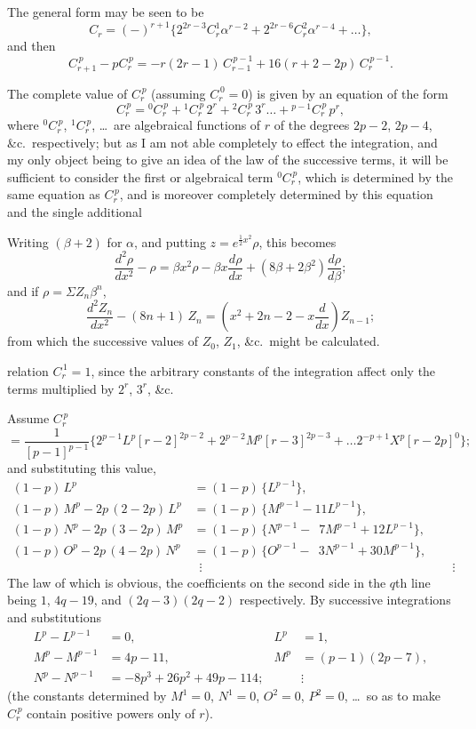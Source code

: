 \documentclass[12pt,a4paper]{article}
\theoremstyle{plain}
\begin{document}
The general form may be seen to be
\[
C_r = (-)^{r+1} \{2^{2r-3} C_r^1 \alpha^{r-2} + 2^{2r-6} C_r^2 \alpha^{r-4} + \ldots\},
\]
and then
\[
C_{r+1}^{\,p} - p C_r^{\,p} = -r(2r-1)\, C_{r-1}^{\,p-1} + 16(r+2-2p)\, C_r^{\,p-1}.
\]

The complete value of $C_r^{\,p}$ (assuming $C_r^{\,0} = 0$) is given by an equation of the form
\[
C_r^{\,p} = {}^0 C_r^{\,p} + {}^1 C_r^{\,p}\, 2^r + {}^2 C_r^{\,p}\, 3^r \ldots + {}^{p-1} C_r^{\,p}\, p^r,
\]
where ${}^0 C_r^{\,p}$, ${}^1 C_r^{\,p}$, \ldots\ are algebraical functions of $r$ of the degrees $2p-2$, $2p-4$, \&c.\ respectively; but as I am not able completely to effect the integration, and my only object being to give an idea of the law of the successive terms, it will be sufficient to consider the first or algebraical term ${}^0 C_r^{\,p}$, which is determined by the same equation as $C_r^{\,p}$, and is moreover completely determined by this equation and the single additional

Writing $(\beta + 2)$ for $\alpha$, and putting $z = e^{\frac{1}{2}x^2} \rho$, this becomes
\[
\frac{d^2 \rho}{dx^2} - \rho = \beta x^2 \rho - \beta x \frac{d\rho}{dx} + (8\beta + 2\beta^2) \frac{d\rho}{d\beta};
\]
and if $\rho = \Sigma Z_n \beta^n$,
\[
\frac{d^2 Z_n}{dx^2} - (8n+1)\,Z_n = \left(x^2 + 2n - 2 - x \frac{d}{dx}\right) Z_{n-1};
\]
from which the successive values of $Z_0$, $Z_1$, \&c.\ might be calculated.


relation $C_r^{\,1} = 1$, since the arbitrary constants of the integration affect only the terms multiplied by $2^r$, $3^r$, \&c.

Assume $C_r^{\,p}$
\[
= \frac{1}{[p-1]^{p-1}} \{2^{p-1} L^p [r-2]^{2p-2} + 2^{p-2} M^p [r-3]^{2p-3} + \ldots 2^{-p+1} X^p [r-2p]^0\};
\]
and substituting this value,
\begin{align*}
(1-p)\,L^p &= (1-p)\,\{L^{p-1}\}, \\
(1-p)\,M^p - 2p\,(2-2p)\,L^p &= (1-p)\,\{M^{p-1} - 11L^{p-1}\}, \\
(1-p)\,N^p - 2p\,(3-2p)\,M^p &= (1-p)\,\{N^{p-1} - \phantom{1}7M^{p-1} + 12L^{p-1}\}, \\
(1-p)\,O^p - 2p\,(4-2p)\,N^p &= (1-p)\,\{O^{p-1} - \phantom{1}3N^{p-1} + 30M^{p-1}\}, \\
&\ \;\vdots & &\ \;\vdots
\end{align*}
The law of which is obvious, the coefficients on the second side in the $q$th line being $1$, $4q-19$, and $(2q-3)(2q-2)$ respectively. By successive integrations and substitutions
\begin{align*}
L^p - L^{p-1} &= 0, & L^p &= 1, \\
M^p - M^{p-1} &= 4p - 11, & M^p &= (p-1)(2p-7), \\
N^p - N^{p-1} &= -8p^3 + 26p^2 + 49p - 114; & &\vdots
\end{align*}
(the constants determined by $M^1 = 0$, $N^1 = 0$, $O^2 = 0$, $P^2 = 0$, \ldots\ so as to make $C_r^{\,p}$ contain positive powers only of $r$).
\end{document}
